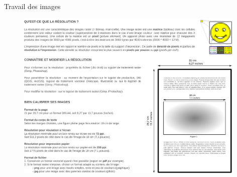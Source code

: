 \begin{frame}{Travail des images}

\begin{figure}
\includegraphics[width=11cm]{ResolutionImages.pdf}
\end{figure}

\end{frame}